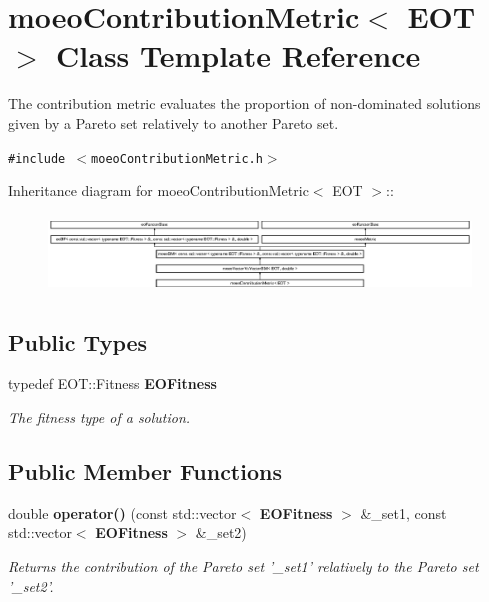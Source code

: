 \section{moeo\-Contribution\-Metric$<$ EOT $>$ Class Template Reference}
\label{classmoeoContributionMetric}
The contribution metric evaluates the proportion of non-dominated solutions given by a Pareto set relatively to another Pareto set.  


{\tt \#include $<$moeo\-Contribution\-Metric.h$>$}

Inheritance diagram for moeo\-Contribution\-Metric$<$ EOT $>$::\begin{figure}[H]
\begin{center}
\leavevmode
\includegraphics[height=2.08644cm]{classmoeoContributionMetric}
\end{center}
\end{figure}
\subsection*{Public Types}
\begin{CompactItemize}
\item 
typedef EOT::Fitness {\bf EOFitness}\label{classmoeoContributionMetric_06c0247b9558eeb34e32c9a694924a66}

\begin{CompactList}\small\item\em The fitness type of a solution. \item\end{CompactList}\end{CompactItemize}
\subsection*{Public Member Functions}
\begin{CompactItemize}
\item 
double {\bf operator()} (const std::vector$<$ {\bf EOFitness} $>$ \&\_\-set1, const std::vector$<$ {\bf EOFitness} $>$ \&\_\-set2)
\begin{CompactList}\small\item\em Returns the contribution of the Pareto set '\_\-set1' relatively to the Pareto set '\_\-set2'. \item\end{CompactList}\end{CompactItemize}
